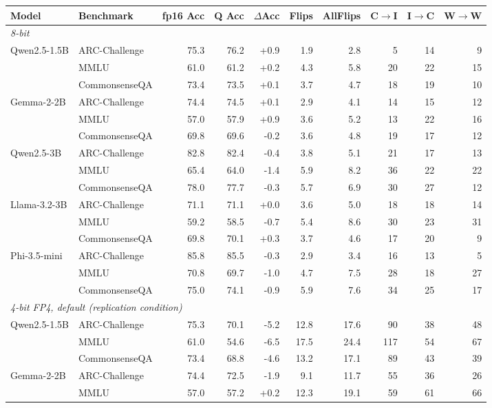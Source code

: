 \begin{tabular}{llrrrrrrrr}
\toprule
Model & Benchmark & fp16 Acc & Q Acc & $\Delta$Acc & Flips & AllFlips & C$\to$I & I$\to$C & W$\to$W \\
\midrule
\multicolumn{10}{l}{\emph{8-bit}} \\
Qwen2.5-1.5B & ARC-Challenge & 75.3 & 76.2 & +0.9 & 1.9 & 2.8 & 5 & 14 & 9 \\
 & MMLU & 61.0 & 61.2 & +0.2 & 4.3 & 5.8 & 20 & 22 & 15 \\
 & CommonsenseQA & 73.4 & 73.5 & +0.1 & 3.7 & 4.7 & 18 & 19 & 10 \\
Gemma-2-2B & ARC-Challenge & 74.4 & 74.5 & +0.1 & 2.9 & 4.1 & 14 & 15 & 12 \\
 & MMLU & 57.0 & 57.9 & +0.9 & 3.6 & 5.2 & 13 & 22 & 16 \\
 & CommonsenseQA & 69.8 & 69.6 & -0.2 & 3.6 & 4.8 & 19 & 17 & 12 \\
Qwen2.5-3B & ARC-Challenge & 82.8 & 82.4 & -0.4 & 3.8 & 5.1 & 21 & 17 & 13 \\
 & MMLU & 65.4 & 64.0 & -1.4 & 5.9 & 8.2 & 36 & 22 & 22 \\
 & CommonsenseQA & 78.0 & 77.7 & -0.3 & 5.7 & 6.9 & 30 & 27 & 12 \\
Llama-3.2-3B & ARC-Challenge & 71.1 & 71.1 & +0.0 & 3.6 & 5.0 & 18 & 18 & 14 \\
 & MMLU & 59.2 & 58.5 & -0.7 & 5.4 & 8.6 & 30 & 23 & 31 \\
 & CommonsenseQA & 69.8 & 70.1 & +0.3 & 3.7 & 4.6 & 17 & 20 & 9 \\
Phi-3.5-mini & ARC-Challenge & 85.8 & 85.5 & -0.3 & 2.9 & 3.4 & 16 & 13 & 5 \\
 & MMLU & 70.8 & 69.7 & -1.0 & 4.7 & 7.5 & 28 & 18 & 27 \\
 & CommonsenseQA & 75.0 & 74.1 & -0.9 & 5.9 & 7.6 & 34 & 25 & 17 \\
\midrule
\multicolumn{10}{l}{\emph{4-bit FP4, default (replication condition)}} \\
Qwen2.5-1.5B & ARC-Challenge & 75.3 & 70.1 & -5.2 & 12.8 & 17.6 & 90 & 38 & 48 \\
 & MMLU & 61.0 & 54.6 & -6.5 & 17.5 & 24.4 & 117 & 54 & 67 \\
 & CommonsenseQA & 73.4 & 68.8 & -4.6 & 13.2 & 17.1 & 89 & 43 & 39 \\
Gemma-2-2B & ARC-Challenge & 74.4 & 72.5 & -1.9 & 9.1 & 11.7 & 55 & 36 & 26 \\
 & MMLU & 57.0 & 57.2 & +0.2 & 12.3 & 19.1 & 59 & 61 & 66 \\

\end{tabular}
